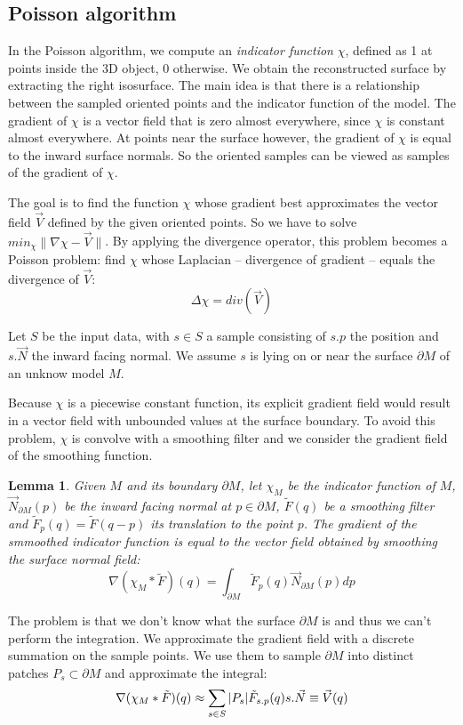 \documentclass[12pt]{article}
\begin{document}
\subsection{Poisson algorithm}
In the Poisson algorithm, we compute an \emph{indicator function} $\chi$, defined as 1 at points inside the 3D object, 0 otherwise. We obtain the reconstructed surface by extracting the right isosurface. The main idea is that there is a relationship between the sampled oriented points and the indicator function of the model. The gradient of $\chi$ is  a vector field that is zero almost everywhere, since $\chi$ is constant almost everywhere. At points near the surface however, the gradient of $\chi$ is equal to the inward surface normals. So the oriented samples can be viewed as samples of the gradient of $\chi$.

The goal is to find the function $\chi$ whose gradient best approximates the vector field $\vec{V}$ defined by the given oriented points. So we have to solve $min_\chi\|\nabla\chi - \vec{V}\|$. By applying the divergence operator, this problem becomes a Poisson problem: find $\chi$ whose Laplacian -- divergence of gradient -- equals the divergence of $\vec{V}$:
$$\Delta\chi = div(\vec{V})$$

Let $S$ be the input data, with $s \in S$ a sample consisting of $s.p$ the position and $s.\vec{N}$ the inward facing normal. We assume $s$ is lying on or near the surface $\partial M$ of an unknow model $M$.

Because $\chi$ is a piecewise constant function, its explicit gradient field would result in a vector field with unbounded values at the surface boundary. To avoid this problem, $\chi$ is convolve with a smoothing filter and we consider the gradient field of the smoothing function.

\newtheorem{lemma}{Lemma}
\begin{lemma}
Given $M$ and its boundary $\partial M$, let $\chi_M$ be the indicator function of $M$, $\vec{N}_{\partial M}(p)$ be the inward facing normal at $p \in \partial M$, $\tilde{F}(q)$ be a smoothing filter and $\tilde{F}_p(q) = \tilde{F}(q-p)$ its translation to the point $p$. The gradient of the smmoothed indicator function is equal to the vector field obtained by smoothing the surface normal field:
$$\nabla(\chi_M * \tilde{F})(q) = \int_{\partial M} \tilde{F}_p(q) \vec{N}_{\partial M}(p) dp$$
\end{lemma}

The problem is that we don't know what the surface $\partial M$ is and thus we can't perform the integration. We approximate the gradient field with a discrete summation on the sample points. We use them to sample $\partial M$ into distinct patches $P_s \subset \partial M$ and approximate the integral:
$$\nabla(\chi_M * \tilde{F})(q) \approx \sum_{s \in S} \\|P_s\\| \tilde{F}_{s.p}(q) s.\vec{N} \equiv \vec{V}(q)$$
\end{document}
